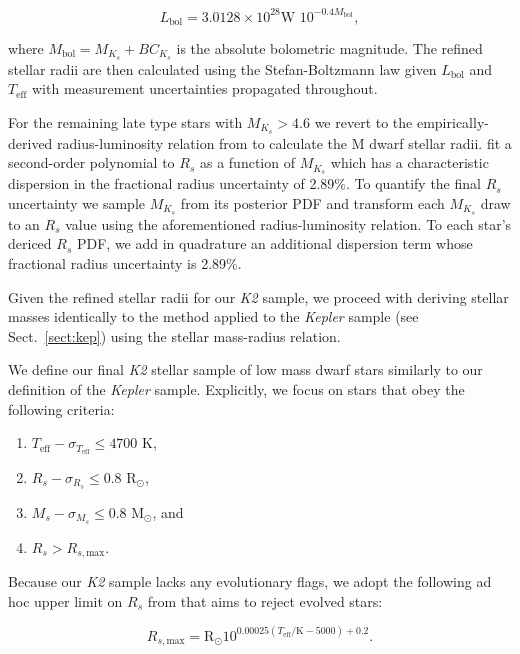 \documentclass[modern]{aastex63}
\newcommand\kepler{\emph{Kepler}}
\newcommand\ktwo{\emph{K2}}
\newcommand\teff{$T_{\text{eff}}$}
\begin{document}
\begin{equation}
  L_{\text{bol}} = 3.0128 \times 10^{28} \text{W } 10^{-0.4 M_{\text{bol}}},
\end{equation}

\noindent where $M_{\text{bol}}=M_{K_s} + BC_{K_s}$ is the absolute bolometric magnitude. The refined stellar radii
are then calculated using the Stefan-Boltzmann law given $L_{\text{bol}}$ and \teff{} with measurement uncertainties
propagated throughout.

For the remaining late type stars with $M_{K_s}>4.6$ we revert to the empirically-derived radius-luminosity relation
from \cite{mann15} to calculate the M dwarf stellar radii. \cite{mann15} fit a second-order polynomial to $R_s$ as
a function of $M_{K_s}$ which has a characteristic dispersion in the fractional radius uncertainty of 2.89\%. To quantify
the final $R_s$ uncertainty we sample $M_{K_s}$ from its posterior PDF and transform each $M_{K_s}$ draw to an $R_s$ value
using the aforementioned radius-luminosity relation. To each star's dericed $R_s$ PDF, we add in quadrature an additional
dispersion term whose fractional radius uncertainty is 2.89\%.

Given the refined stellar radii for our \ktwo{} sample, we proceed with deriving stellar masses identically to the method
applied to the \kepler{} sample (see Sect.~\ref{sect:kep}) using the \cite{boyajian12} stellar mass-radius relation. 

We define our final \ktwo{} stellar sample of low mass dwarf stars similarly to our definition of the \kepler{} sample.
Explicitly, we focus on stars that obey the following criteria:

\begin{enumerate}
\item $T_{\text{eff}} - \sigma_{T_{\text{eff}}} \leq 4700$ K,
\item $R_s - \sigma_{R_s} \leq 0.8$ R$_{\odot}$,
\item $M_s - \sigma_{M_s} \leq 0.8$ M$_{\odot}$, and
\item $R_s > R_{s,\text{max}}$.
\end{enumerate}

\noindent Because our \ktwo{} sample lacks any evolutionary flags, we adopt the following ad hoc upper limit on $R_s$
from \cite{fulton18} that aims to reject evolved stars:

\begin{equation}
  R_{s,\text{max}} = \text{R}_{\odot} 10^{0.00025(T_{\text{eff}}/\text{K}-5000)+0.2}.
\end{equation}
\end{document}
